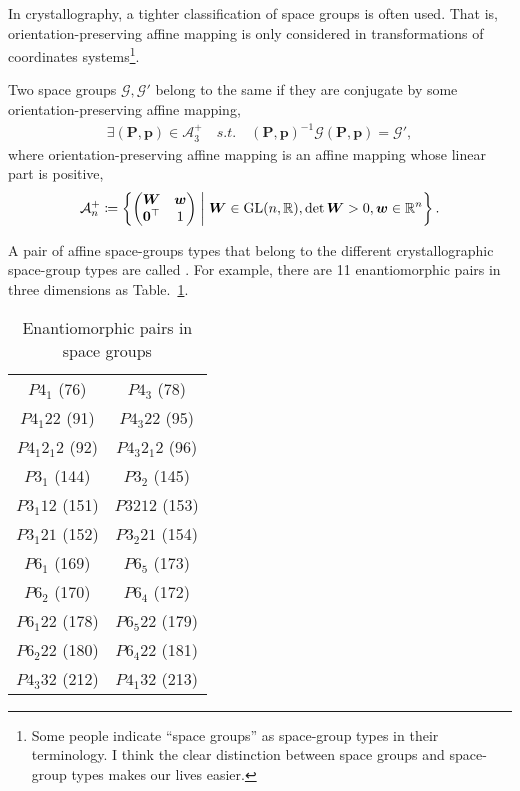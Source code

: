In crystallography, a tighter classification of space groups is often used.
That is, orientation-preserving affine mapping is only considered in transformations of coordinates systems\footnote{
  Some people indicate ``space groups'' as space-group types in their terminology.
  I think the clear distinction between space groups and space-group types makes our lives easier.
}.

\begin{screen}
  \begin{defn}
    Two space groups $\mathcal{G}, \mathcal{G}'$ belong to the same  if they are conjugate by some orientation-preserving affine mapping,
    \begin{align}
      \exists (\bm{P}, \bm{p}) \in \mathcal{A}^{+}_{3} \quad s.t. \quad (\bm{P}, \bm{p})^{-1} \mathcal{G} (\bm{P}, \bm{p}) = \mathcal{G}',
    \end{align}
    where orientation-preserving affine mapping is an affine mapping whose linear part is positive,
    \begin{align}
      \mathcal{A}^{+}_{n} \coloneqq \left\{  \begin{pmatrix} \bm{W} & \bm{w} \\ \bm{0}^{\top} & 1 \end{pmatrix}  \mathrel{}\middle|\mathrel{}  \bm{W} \in \mathrm{GL}(n, \mathbb{R}), \det \bm{W} > 0, \bm{w} \in \mathbb{R}^{n}  \right\}.
    \end{align}
  \end{defn}
\end{screen}

A pair of affine space-groups types that belong to the different crystallographic space-group types are called .
For example, there are 11 enantiomorphic pairs in three dimensions as Table.~\ref{table:enantiomorphic-pairs-3d}.

\begin{table}[tb]
  \centering
  \caption{Enantiomorphic pairs in space groups}
  \label{table:enantiomorphic-pairs-3d}
  \begin{tabular}[h]{cc}
    $P 4_{1}$ (76)         & $P 4_{3}$ (78) \\
    $P 4_{1} 2 2$ (91)     & $P 4_{3} 2 2$ (95) \\
    $P 4_{1} 2_{1} 2$ (92) & $P 4_{3} 2_{1} 2$ (96) \\
    $P 3_{1}$ (144)        & $P 3_{2}$ (145) \\
    $P 3_{1} 1 2$ (151)    & $P 3{2} 1 2$ (153) \\
    $P 3_{1} 2 1$ (152)    & $P 3_{2} 2 1$ (154) \\
    $P 6_{1}$ (169)        & $P 6_{5}$ (173) \\
    $P 6_{2}$ (170)        & $P 6_{4}$ (172) \\
    $P 6_{1} 2 2$ (178)    & $P 6_{5} 2 2$ (179) \\
    $P 6_{2} 2 2$ (180)    & $P 6_{4} 2 2$ (181) \\
    $P 4_{3} 3 2$ (212)    & $P 4_{1} 3 2$ (213)
  \end{tabular}
\end{table}

